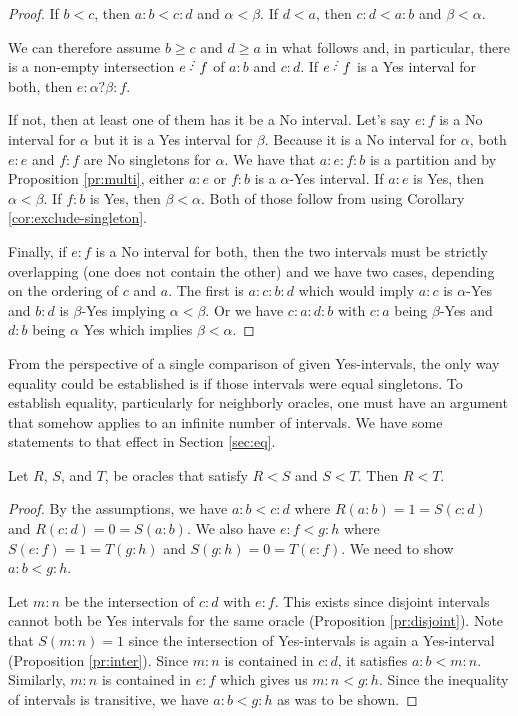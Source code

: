 \documentclass[12pt]{article}
\begin{document}
\begin{proof}
     If $b < c$, then $a:b < c:d$ and $\alpha < \beta$. If $d < a$, then $c:d < a:b$ and $\beta < \alpha$. 
     
     We can therefore assume $b \geq c$ and $d \geq a$ in what follows and, in particular, there is a non-empty intersection $e\lte f$ of $a:b$ and $c:d$.  If $e \lte f$ is a Yes interval for both, then $e:\alpha ? \beta:f$. 
     
     If not, then at least one of them has it be a No interval. Let's say $e:f$ is a No interval for $\alpha$ but it is a Yes interval for $\beta$. Because it is a No interval for $\alpha$, both $e:e$ and $f:f$ are No singletons for $\alpha$. We have that $a:e:f:b$ is a partition and by Proposition \ref{pr:multi}, either $a:e$ or $f:b$ is a $\alpha$-Yes interval. If $a:e$ is Yes, then $\alpha < \beta$. If $f:b$ is Yes, then $\beta < \alpha$. Both of those follow from using Corollary \ref{cor:exclude-singleton}. 
     
     Finally, if $e:f$ is a No interval for both, then the two intervals must be strictly overlapping (one does not contain the other) and we have two cases, depending on the ordering of $c$ and $a$. The first is $a:c:b:d$ which would imply $a:c$ is $\alpha$-Yes and $b:d$ is $\beta$-Yes implying $\alpha < \beta$. Or we have $c:a:d:b$ with $c:a$ being $\beta$-Yes and $d:b$ being $\alpha$ Yes which implies $\beta < \alpha$. 
     
\end{proof}

From the perspective of a single comparison of given Yes-intervals, the only way equality could be established is if those intervals were equal singletons. To establish equality, particularly for neighborly oracles, one must have an argument that somehow applies to an infinite number of intervals. We have some statements to that effect in Section \ref{sec:eq}. 

\begin{proposition}\label{pr:transitive}
Let $R$, $S$, and $T$, be oracles that satisfy $R<S$ and $S < T$. Then $R < T$.
\end{proposition}

\begin{proof}
By the assumptions, we have $a:b < c:d$ where $R(a:b) = 1 = S(c:d)$ and $R(c:d) = 0 = S(a:b)$. We also have $e:f < g:h$ where $S(e:f) = 1 = T(g:h)$ and $S(g:h) = 0 = T(e:f)$. We need to show $a:b < g:h$.

Let $m:n$ be the intersection of $c:d$ with $e:f$. This exists since disjoint intervals cannot both be Yes intervals for the same oracle (Proposition \ref{pr:disjoint}). Note that $S(m:n) = 1$ since the intersection of Yes-intervals is again a Yes-interval (Proposition \ref{pr:inter}). Since $m:n$ is contained in $c:d$, it satisfies $a:b < m:n$. Similarly, $m:n$ is contained in $e:f$ which gives us $m:n < g:h$. Since the inequality of intervals is transitive, we have $a:b < g:h$ as was to be shown. 
\end{proof}
\end{document}
